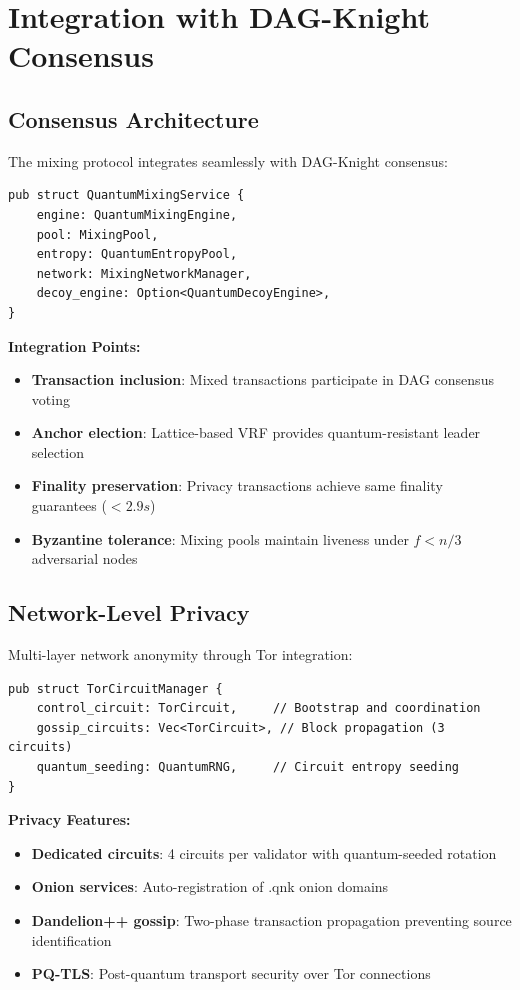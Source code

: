 \documentclass[12pt,a4paper]{article}
\begin{document}
\section{Integration with DAG-Knight Consensus}

\subsection{Consensus Architecture}

The mixing protocol integrates seamlessly with DAG-Knight consensus:

\begin{lstlisting}[style=rustcode, caption=Mixing Service Integration]
pub struct QuantumMixingService {
    engine: QuantumMixingEngine,
    pool: MixingPool,
    entropy: QuantumEntropyPool,
    network: MixingNetworkManager,
    decoy_engine: Option<QuantumDecoyEngine>,
}
\end{lstlisting}

\textbf{Integration Points:}
\begin{itemize}
\item \textbf{Transaction inclusion}: Mixed transactions participate in DAG consensus voting
\item \textbf{Anchor election}: Lattice-based VRF provides quantum-resistant leader selection
\item \textbf{Finality preservation}: Privacy transactions achieve same finality guarantees ($< 2.9s$)
\item \textbf{Byzantine tolerance}: Mixing pools maintain liveness under $f < n/3$ adversarial nodes
\end{itemize}

\subsection{Network-Level Privacy}

Multi-layer network anonymity through Tor integration:

\begin{lstlisting}[style=rustcode, caption=Tor Circuit Management]
pub struct TorCircuitManager {
    control_circuit: TorCircuit,     // Bootstrap and coordination
    gossip_circuits: Vec<TorCircuit>, // Block propagation (3 circuits)
    quantum_seeding: QuantumRNG,     // Circuit entropy seeding
}
\end{lstlisting}

\textbf{Privacy Features:}
\begin{itemize}
\item \textbf{Dedicated circuits}: 4 circuits per validator with quantum-seeded rotation
\item \textbf{Onion services}: Auto-registration of .qnk onion domains
\item \textbf{Dandelion++ gossip}: Two-phase transaction propagation preventing source identification
\item \textbf{PQ-TLS}: Post-quantum transport security over Tor connections
\end{itemize}
\end{document}
